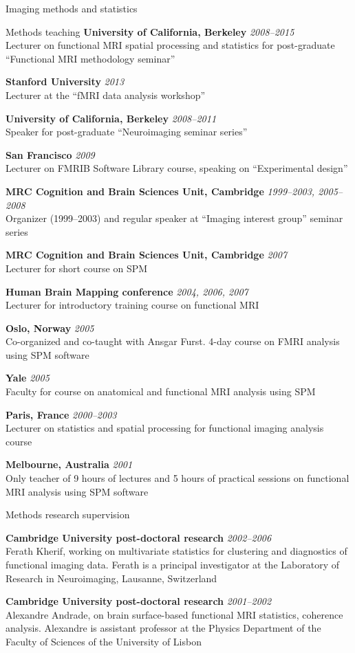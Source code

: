 \documentclass{cv}
\newcommand{\PlaceDateNote}[3]{{\bf #1} \hfill {\em #2} \\#3}
\newcommand{\UCB}{University of California, Berkeley}
\newcommand{\CBU}{MRC Cognition and Brain Sciences Unit, Cambridge}
\begin{document}
\begin{cvSection}{Imaging methods and statistics}
\begin{cvSubSection}{Methods teaching}
\PlaceDateNote{\UCB}{2008--2015}
{Lecturer on functional MRI spatial processing and statistics for
post-graduate ``Functional MRI methodology seminar''}

\PlaceDateNote{Stanford University}{2013}
{Lecturer at the ``fMRI data analysis workshop''}

\PlaceDateNote{\UCB}{2008--2011}
{Speaker for post-graduate ``Neuroimaging seminar series''}

\PlaceDateNote{San Francisco}{2009}
{Lecturer on FMRIB Software Library course, speaking on ``Experimental
design''}

\PlaceDateNote{\CBU}{1999--2003, 2005--2008}
{Organizer (1999--2003) and regular speaker at ``Imaging interest group''
seminar series}

\PlaceDateNote{\CBU}{2007}
{Lecturer for short course on SPM}

\PlaceDateNote{Human Brain Mapping conference}{2004, 2006, 2007}
{Lecturer for introductory training course on functional MRI}

\PlaceDateNote{Oslo, Norway}{2005}
{Co-organized and co-taught with Ansgar Furst. 4-day course on FMRI analysis
using SPM software}

\PlaceDateNote{Yale}{2005}
{Faculty for course on anatomical and functional MRI analysis using SPM}

\PlaceDateNote{Paris, France}{2000--2003}
{Lecturer on statistics and spatial processing for functional imaging analysis
course}

\PlaceDateNote{Melbourne, Australia}{2001}
{Only teacher of 9 hours of lectures and 5 hours of practical sessions on
functional MRI analysis using SPM software}

\end{cvSubSection}

\begin{cvSubSection}{Methods research supervision}

\PlaceDateNote{Cambridge University post-doctoral research}{2002--2006}
{Ferath Kherif, working on multivariate statistics for clustering and
diagnostics of functional imaging data. Ferath is a principal investigator at
the Laboratory of Research in Neuroimaging, Lausanne, Switzerland}

\PlaceDateNote{Cambridge University post-doctoral research}{2001--2002}
{Alexandre Andrade, on brain surface-based functional MRI statistics, coherence
analysis.  Alexandre is assistant professor at the Physics Department of the
Faculty of Sciences of the University of Lisbon}


\end{cvSubSection}
\end{cvSection}
\end{document}

